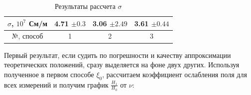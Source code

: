 \documentclass[a4paper,12pt]{article} %
\begin{document}
\begin{table}[H]
	\centering
	\begin{tabular}{|c|c|c|c|}
		\hline
		$ \sigma $, $10^7$ См/м   & 4.71 $\pm 0.3$ & 3.06 $\pm 2.49$ & 3.61 $\pm 0.44$ \\ \hline
		№, способ   & 1  & 2 & 3 \\ \hline
	\end{tabular}
	\caption{Результаты рассчета $\sigma$}
	\label{tab:my-table1}
\end{table}

Первый результат, если судить по погрешности и качеству аппроксимации теоретических положений, сразу выделяется на фоне двух других. Используя полученное в первом способе $\xi_0$, рассчитаем коэффициент ослабления поля для всех измерений и получим график $\frac{H_1}{H_0}$ от $\nu$:
\end{document}
